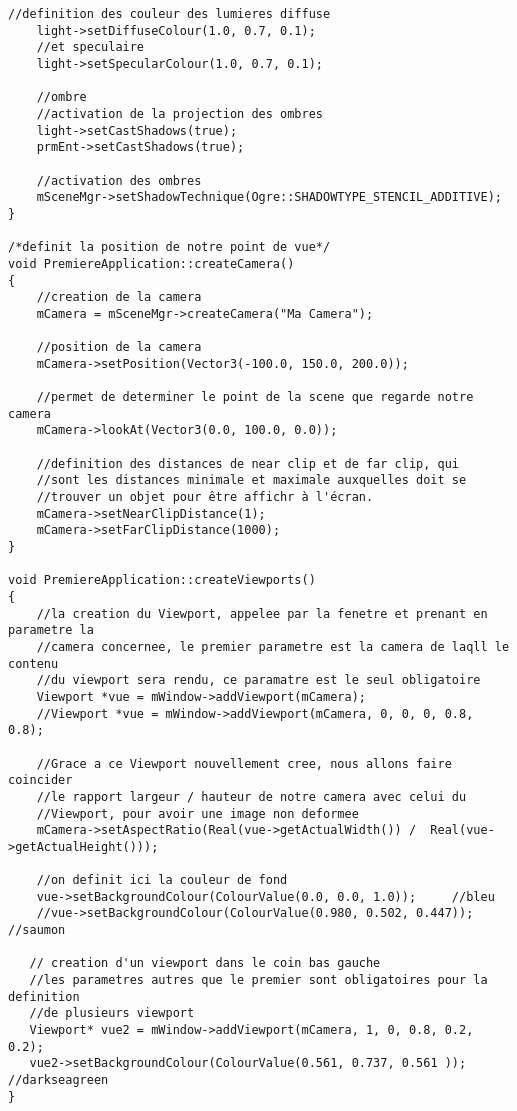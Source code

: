 \begin{lstlisting}[caption={PremiereApplication.cpp}]
    //definition des couleur des lumieres diffuse
    light->setDiffuseColour(1.0, 0.7, 0.1);
    //et speculaire
    light->setSpecularColour(1.0, 0.7, 0.1);

    //ombre
    //activation de la projection des ombres
    light->setCastShadows(true);
    prmEnt->setCastShadows(true);

    //activation des ombres
    mSceneMgr->setShadowTechnique(Ogre::SHADOWTYPE_STENCIL_ADDITIVE);
}

/*definit la position de notre point de vue*/
void PremiereApplication::createCamera()
{
    //creation de la camera
    mCamera = mSceneMgr->createCamera("Ma Camera");

    //position de la camera
    mCamera->setPosition(Vector3(-100.0, 150.0, 200.0));

    //permet de determiner le point de la scene que regarde notre camera
    mCamera->lookAt(Vector3(0.0, 100.0, 0.0));

    //definition des distances de near clip et de far clip, qui
    //sont les distances minimale et maximale auxquelles doit se
    //trouver un objet pour être affichr à l'écran.
    mCamera->setNearClipDistance(1);
    mCamera->setFarClipDistance(1000);
}

void PremiereApplication::createViewports()
{
    //la creation du Viewport, appelee par la fenetre et prenant en parametre la
    //camera concernee, le premier parametre est la camera de laqll le contenu
    //du viewport sera rendu, ce paramatre est le seul obligatoire
    Viewport *vue = mWindow->addViewport(mCamera);
    //Viewport *vue = mWindow->addViewport(mCamera, 0, 0, 0, 0.8, 0.8);

    //Grace a ce Viewport nouvellement cree, nous allons faire coincider
    //le rapport largeur / hauteur de notre camera avec celui du
    //Viewport, pour avoir une image non deformee
    mCamera->setAspectRatio(Real(vue->getActualWidth()) /  Real(vue->getActualHeight()));

    //on definit ici la couleur de fond
    vue->setBackgroundColour(ColourValue(0.0, 0.0, 1.0));     //bleu
    //vue->setBackgroundColour(ColourValue(0.980, 0.502, 0.447)); //saumon

   // creation d'un viewport dans le coin bas gauche
   //les parametres autres que le premier sont obligatoires pour la definition
   //de plusieurs viewport
   Viewport* vue2 = mWindow->addViewport(mCamera, 1, 0, 0.8, 0.2, 0.2);
   vue2->setBackgroundColour(ColourValue(0.561, 0.737, 0.561 ));  //darkseagreen
}


\end{lstlisting}




